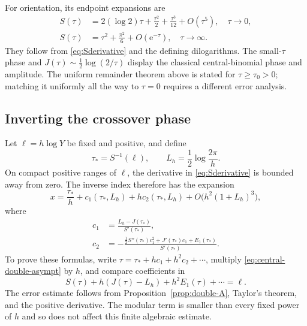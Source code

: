 \documentclass[11pt]{article}
\numberwithin{equation}{section}
\theoremstyle{definition}
\newcommand{\ee}{\mathrm e}
\begin{document}
For orientation, its endpoint expansions are
\begin{align}
 S(\tau)&=2(\log2)\tau+\frac{\tau^2}{2}
                  +\frac{\tau^3}{12}+O(\tau^5),\quad\tau\to0,
 \label{eq:Ssmall}\\
 S(\tau)&=\tau^2+\frac{\pi^2}{6}+O(\ee^{-\tau}),\quad\tau\to\infty.
 \label{eq:Slarge}
\end{align}
They follow from \eqref{eq:Sderivative} and the defining dilogarithms. The small-$\tau$ phase and $J(\tau)\sim\tfrac12\log(2/\tau)$ display the classical central-binomial phase and amplitude. The uniform remainder theorem above is stated for $\tau\ge\tau_0>0$; matching it uniformly all the way to $\tau=0$ requires a different error analysis.

\subsection{Inverting the crossover phase}

Let $\ell=h\log Y$ be fixed and positive, and define
\begin{equation}\label{eq:crossover-center}
 \tau_*=S^{-1}(\ell),\qquad
 L_h=\frac12\log\frac{2\pi}{h}.
\end{equation}
On compact positive ranges of $\ell$, the derivative in \eqref{eq:Sderivative} is bounded away from zero. The inverse index therefore has the expansion
\begin{equation}\label{eq:crossover-inverse}
 x=\frac{\tau_*}{h}+c_1(\tau_*,L_h)
                         +h c_2(\tau_*,L_h)
                         +O\bigl(h^2(1+L_h)^3\bigr),
\end{equation}
where
\begin{align}
 c_1&=\frac{L_h-J(\tau_*)}{S'(\tau_*)},\label{eq:crossover-c1}\\
 c_2&=-\frac{\tfrac12 S''(\tau_*)c_1^2
                  +J'(\tau_*)c_1+E_1(\tau_*)}{S'(\tau_*)}.
 \label{eq:crossover-c2}
\end{align}
To prove these formulas, write $\tau=\tau_*+hc_1+h^2c_2+\cdots$, multiply \eqref{eq:central-double-asympt} by $h$, and compare coefficients in
\[
 S(\tau)+h(J(\tau)-L_h)+h^2E_1(\tau)+\cdots=\ell.
\]
The error estimate follows from Proposition~\ref{prop:double-A}, Taylor's theorem, and the positive derivative. The modular term is smaller than every fixed power of $h$ and so does not affect this finite algebraic estimate.
\end{document}
